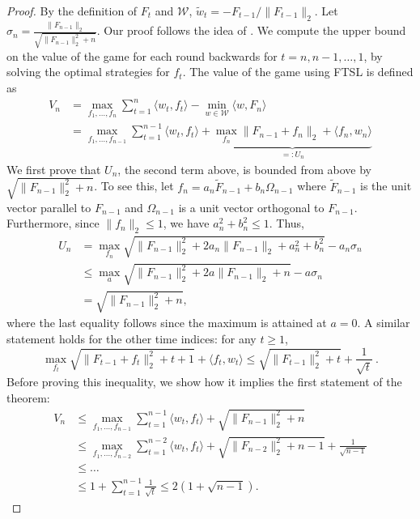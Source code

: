 \documentclass[english]{article}
\newcommand{\cW}{\mathcal{W}}
\newcommand{\inpro}[2]{\langle #1, #2\rangle}
\begin{document}
\begin{proof}
	By the definition of $F_t$ and $\cW$, $\tilde{w}_{t} =- F_{t-1}/\|F_{t-1}\|_2$.
	Let $\sigma_n = \frac{\|F_{n-1}\|_2}{\sqrt{\|F_{n-1}\|_2^2 + n}}$.
	Our proof follows the idea of \citet{abernethy2008optimal}. We compute the upper bound on the value of the game for each round backwards for $t=n,n-1,\dots,1$, by solving the optimal strategies for $f_t$.
	The value of the game using FTSL is defined as
	\begin{align*}
	V_n & = \max_{f_1, \ldots, f_n} \sum_{t=1}^{n}\inpro{w_t}{f_t}- \min_{w\in\cW} \inpro{w}{F_n} \\
	& = \max_{f_1,\ldots, f_{n-1}} \sum_{t=1}^{n-1}\inpro{w_t}{f_t} + \underbrace{\max_{f_n} \|F_{n-1}+f_n\|_2 + \inpro{f_n}{w_n}}_{=:U_n}
	\end{align*}
We first prove that $U_n$, the second term above, is bounded from above by  $\sqrt{\|F_{n-1}\|_2^2 + n}$. To see this, let $f_n = a_n \tilde{F}_{n-1} + b_n \Omega_{n-1}$ where $\tilde{F}_{n-1}$ is the unit vector parallel to $F_{n-1}$ and $\Omega_{n-1}$ is a unit vector orthogonal to $F_{n-1}$.  Furthermore, since $\|f_n\|_2 \le 1$, we have $a_n^2+b_n^2 \le 1$.
Thus,
\begin{align*}
U_n & = \max_{f_n} \sqrt{\|F_{n-1}\|_2^2 + 2a_n\|F_{n-1}\|_2 + a_n^2 + b_n^2} - a_n\sigma_{n}\\
 & \le \max_{a} \sqrt{\|F_{n-1}\|_2^2 + 2a\|F_{n-1}\|_2 + n} - a\sigma_{n}\\
 & = \sqrt{\|F_{n-1}\|_2^2 + n},
\end{align*}  
where the last equality follows since the maximum is attained at $a=0$. 
A similar statement holds for the other time indices: for any $t \ge 1$,
\begin{equation}
\label{eq:stepDiff1}
\max_{f_t} \sqrt{\|F_{t-1} + f_t\|_2^2 + t + 1} + \inpro{f_t}{w_t} \le  \sqrt{\|F_{t-1}\|_2^2 + t} + \frac{1}{\sqrt{t}}~.
\end{equation}
Before proving this inequality, we show how it implies the first statement of the theorem:
\begin{align*}
V_n & \le \max_{f_1,\ldots, f_{n-1}} \sum_{t=1}^{n-1}\inpro{w_t}{f_t} + \sqrt{\|F_{n-1}\|_2^2 + n} \\
& \le \max_{f_1,\ldots, f_{n-2}} \sum_{t=1}^{n-2}\inpro{w_t}{f_t}  + \sqrt{\|F_{n-2}\|_2^2 + n-1} + \frac{1}{\sqrt{n-1}} \\
& \le \ldots \\
& \le 1+ \sum_{t=1}^{n-1}\frac{1}{\sqrt{t}} \le 2(1+\sqrt{n-1}).
\end{align*}

\end{proof}
\end{document}
